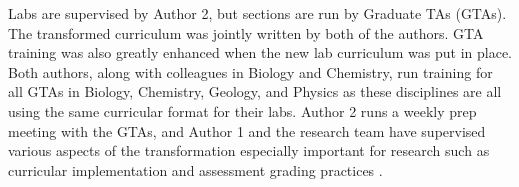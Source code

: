 \documentclass[aip, numerical, preprint]{revtex4-2}
\begin{document}

Labs are supervised by Author 2, but sections are run by Graduate TAs (GTAs). The
transformed curriculum was jointly written by both of the authors.  GTA training was also greatly
enhanced when the new lab curriculum was put in place.  Both authors, along with colleagues in
Biology and Chemistry, run training for all GTAs in Biology, Chemistry, Geology, and Physics
as these disciplines are all using the same curricular format for their labs.  Author 2 runs a
weekly prep meeting with the GTAs, and Author 1 and the research team have supervised various
aspects of the transformation especially important for research such as curricular
implementation \citep{SmithJoyner2020} and assessment grading practices \citep{Wolf2019mask}.
\end{document}
